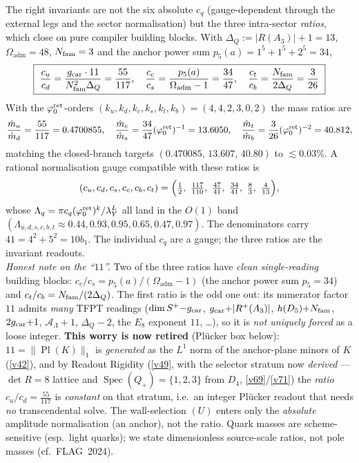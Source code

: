 \begin{keybox}
The right invariants are not the six absolute $c_q$ (gauge-dependent through the external legs and the
sector normalisation) but the three intra-sector \emph{ratios}, which close on pure compiler building
blocks. With $\Delta_Q:=|R(A_3)|{+}1=13$, $\Omega_{\mathrm{adm}}=48$, $N_{\mathrm{fam}}=3$ and the anchor power sum
$p_5(a)=1^5{+}1^5{+}2^5=34$,
\[
  \boxed{\
  \frac{c_u}{c_d}=\frac{g_{\mathrm{car}}\cdot 11}{N_{\mathrm{fam}}^{2}\Delta_Q}=\frac{55}{117},\quad
  \frac{c_c}{c_s}=\frac{p_5(a)}{\Omega_{\mathrm{adm}}-1}=\frac{34}{47},\quad
  \frac{c_t}{c_b}=\frac{N_{\mathrm{fam}}}{2\Delta_Q}=\frac{3}{26}\ }
\]
With the $\varphi_0^{\mathrm{ret}}$-orders $(k_u,k_d,k_c,k_s,k_t,k_b)=(4,4,2,3,0,2)$ the mass ratios are
\[
  \frac{\hat m_u}{\hat m_d}=\frac{55}{117}=0.4700855,\quad
  \frac{\hat m_c}{\hat m_s}=\frac{34}{47}(\varphi_0^{\mathrm{ret}})^{-1}=13.6050,\quad
  \frac{\hat m_t}{\hat m_b}=\frac{3}{26}(\varphi_0^{\mathrm{ret}})^{-2}=40.812,
\]
matching the closed-branch targets $(0.470085,\,13.607,\,40.80)$ to $\lesssim0.03\%$. A rational
normalisation gauge compatible with these ratios is
\[
  (c_u,c_d,c_s,c_c,c_b,c_t)=\Bigl(\tfrac12,\ \tfrac{117}{110},\ \tfrac{47}{41},\ \tfrac{34}{41},\ \tfrac83,\ \tfrac4{13}\Bigr),
\]
whose $\Lambda_q=\pi c_q(\varphi_0^{\mathrm{ret}})^{k}/\lambda_Y^{L}$ all land in the $O(1)$ band
$(\Lambda_{u,d,s,c,b,t}\approx 0.44,0.93,0.95,0.65,0.47,0.97)$. The denominators carry $41=4^2{+}5^2=10b_1$.
The individual $c_q$ are a gauge; the three ratios are the invariant readouts. 
\smallskip\\
\noindent\emph{Honest note on the ``$11$''.} Two of the three ratios have \emph{clean single-reading}
building blocks: $c_c/c_s=p_5(a)/(\Omega_{\mathrm{adm}}{-}1)$ (the anchor power sum $p_5{=}34$) and
$c_t/c_b=N_{\mathrm{fam}}/(2\Delta_Q)$. The first ratio is the odd one out: its numerator factor $11$ admits
\emph{many} TFPT readings ($\dim S^+{-}g_{\mathrm{car}}$, $g_{\mathrm{car}}{+}|R^+(A_3)|$, $h(D_5){+}N_{\mathrm{fam}}$, $2g_{\mathrm{car}}{+}1$,
$\mathcal A_\Lambda{+}1$, $\Delta_Q{-}2$, the $E_8$ exponent $11$, \dots), so it is \emph{not uniquely
forced} as a loose integer. \textbf{This worry is now retired} (Plücker box below): $11=\|\operatorname{Pl}(K)\|_1$
is \emph{generated} as the $L^1$ norm of the anchor-plane minors of $K$ (\vref{v42}), and by Readout Rigidity (\vref{v49},
with the selector stratum now \emph{derived} --- $\det R=8$ lattice and $\operatorname{Spec}(Q_+)=\{1,2,3\}$
from $D_4$, \vref{v69}/\vref{v71}) the \emph{ratio} $c_u/c_d=\tfrac{55}{117}$ is \emph{constant} on that stratum, i.e.\ an
integer Pl\"ucker readout that needs \emph{no} transcendental solve. The wall-selection $(U)$ enters only the
\emph{absolute} amplitude normalisation (an anchor), not the ratio. 
Quark masses are scheme-sensitive (esp.\ light quarks); we state dimensionless source-scale ratios, not pole
masses (cf.\ FLAG~2024).
\end{keybox}

